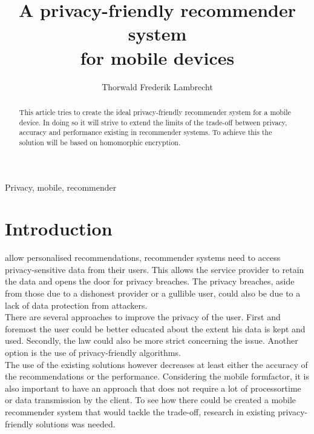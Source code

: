 \documentclass[twocolumn]{phdsymp} %
\begin{document}
\title{A privacy-friendly recommender system\\ for mobile devices} %

\author{Thorwald Frederik Lambrecht}


\maketitle

\begin{abstract}
This article tries to create the ideal privacy-friendly recommender system for a mobile device. In doing so it will strive to extend the limits of the trade-off between privacy, accuracy and performance existing in recommender systems. To achieve this the solution will be based on  homomorphic encryption.
\end{abstract}

\begin{keywords}
Privacy, mobile, recommender
\end{keywords}

\section{Introduction}
 allow personalised recommendations, recommender systems need to access privacy-sensitive data from their users. This allows the service provider to retain the data and opens the door for privacy breaches. The privacy breaches, aside from those due to a dishonest provider or a gullible user, could also be due to a lack of data protection from attackers.\\ There are several approaches to improve the privacy of the user. First and foremost the user could be better educated about the extent his data is kept and used. Secondly, the law could also be more strict concerning the issue. Another option is the use of privacy-friendly algorithms. \\
The use of the existing solutions however decreases at least either the accuracy of the recommendations or the performance. Considering the mobile formfactor, it is also important to have an approach that does not require a lot of processortime or data transmission by the client. To see how there could be created a mobile recommender system that would tackle the trade-off, research in existing privacy-friendly solutions was needed. 
\end{document}
